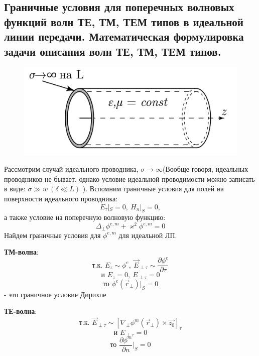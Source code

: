 
\subsection{Граничные условия для поперечных волновых функций волн ТЕ, ТМ, ТЕМ типов в идеальной линии передачи. Математическая формулировка задачи описания волн ТЕ, ТМ, ТЕМ типов.}
\begin{figure}[h!]
  \centering
  \includegraphics[width = 0.6\linewidth]{img/t21.pdf}
\end{figure}
Рассмотрим случай идеального проводника, $\sigma \rightarrow \infty$(Вообще говоря, идеальных проводников не бывает,
однако условие идеальной проводимости можно записать в виде: $\sigma \gg w ~(\delta \ll L)$ ).
Вспомним граничные условия для полей на поверхности идеального проводника:
\begin{equation}
  E_{\tau}|_S = 0,~H_n|_S = 0,
\end{equation}
а также условие на поперечную волновую функцию:
\begin{equation}
  \Delta_{\perp}\phi^{e,m}+\varkappa^2\phi^{e,m}=0
\end{equation}
Найдем граничные условия для $\phi^{e,m}$ для идеальной ЛП.

\textbf{ТМ-волна}:
\begin{equation}
  \text{т.к. }E_z \sim \phi^e,~\vec{E}_{\perp \tau}\sim \frac{\partial \phi^e}{\partial \tau} 
\end{equation}
\begin{equation}
  \text{и }E_z = 0,~E_{\perp \tau} = 0 
\end{equation}
\begin{equation}
  \text{то }\phi^{e}(\vec{r}_{\perp})|_S = 0
\end{equation}
- это граничное условие Дирихле

\textbf{ТЕ-волна}:
\begin{equation}
  \text{т.к. }\vec{E}_{\perp \tau}\sim [\nabla_{\perp} \phi^m(\vec{r}_{\perp})\times\vec{z_0}]_{\tau} 
\end{equation}
\begin{equation}
  \text{и }E_{\perp \tau} = 0 
\end{equation}
\begin{equation}
  \text{то }\frac{\partial \phi^m}{\partial n}|_S = 0
\end{equation}

